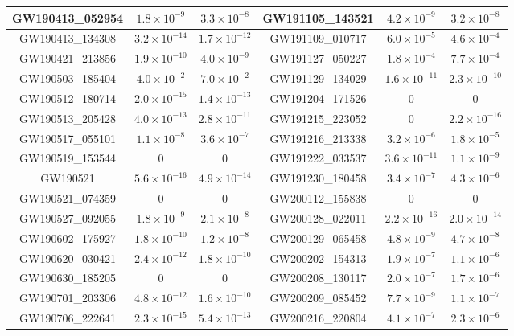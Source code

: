 \begin{refsection}
\begin{table}
{\begin{tabular}{|c|c|c||c|c|c|}
\hline GW190413\_052954 & $1.8\times 10^{-9}$ & $3.3\times 10^{-8}$ & GW191105\_143521 & $4.2\times 10^{-9}$ & $3.2\times 10^{-8}$ \\ 
\hline GW190413\_134308 & $3.2\times 10^{-14}$ & $1.7\times 10^{-12}$ & GW191109\_010717 & $6.0\times 10^{-5}$ & $4.6\times 10^{-4}$ \\ 
\hline GW190421\_213856 & $1.9\times 10^{-10}$ & $4.0\times 10^{-9}$ & GW191127\_050227 & $1.8\times 10^{-4}$ & $7.7\times 10^{-4}$ \\ 
\hline GW190503\_185404 & $4.0\times 10^{-2}$ & $7.0\times 10^{-2}$ & GW191129\_134029 & $1.6\times 10^{-11}$ & $2.3\times 10^{-10}$ \\ 
\hline GW190512\_180714 & $2.0\times 10^{-15}$ & $1.4\times 10^{-13}$ & GW191204\_171526 & $0$ & $0$ \\ 
\hline GW190513\_205428 & $4.0\times 10^{-13}$ & $2.8\times 10^{-11}$ & GW191215\_223052 & $0$ & $2.2\times 10^{-16}$ \\ 
\hline GW190517\_055101 & $1.1\times 10^{-8}$ & $3.6\times 10^{-7}$ & GW191216\_213338 & $3.2\times 10^{-6}$ & $1.8\times 10^{-5}$ \\ 
\hline GW190519\_153544 & $0$ & $0$ & GW191222\_033537 & $3.6\times 10^{-11}$ & $1.1\times 10^{-9}$ \\ 
\hline GW190521 & $5.6\times 10^{-16}$ & $4.9\times 10^{-14}$ & GW191230\_180458 & $3.4\times 10^{-7}$ & $4.3\times 10^{-6}$ \\ 
\hline GW190521\_074359 & $0$ & $0$ & GW200112\_155838 & $0$ & $0$ \\ 
\hline GW190527\_092055 & $1.8\times 10^{-9}$ & $2.1\times 10^{-8}$ & GW200128\_022011 & $2.2\times 10^{-16}$ & $2.0\times 10^{-14}$ \\ 
\hline GW190602\_175927 & $1.8\times 10^{-10}$ & $1.2\times 10^{-8}$ & GW200129\_065458 & $4.8\times 10^{-9}$ & $4.7\times 10^{-8}$ \\ 
\hline GW190620\_030421 & $2.4\times 10^{-12}$ & $1.8\times 10^{-10}$ & GW200202\_154313 & $1.9\times 10^{-7}$ & $1.1\times 10^{-6}$ \\ 
\hline GW190630\_185205 & $0$ & $0$ & GW200208\_130117 & $2.0\times 10^{-7}$ & $1.7\times 10^{-6}$ \\ 
\hline GW190701\_203306 & $4.8\times 10^{-12}$ & $1.6\times 10^{-10}$ & GW200209\_085452 & $7.7\times 10^{-9}$ & $1.1\times 10^{-7}$ \\ 
\hline GW190706\_222641 & $2.3\times 10^{-15}$ & $5.4\times 10^{-13}$ & GW200216\_220804 & $4.1\times 10^{-7}$ & $2.3\times 10^{-6}$ \\ 

\end{tabular}}
\end{table}
\end{refsection}
